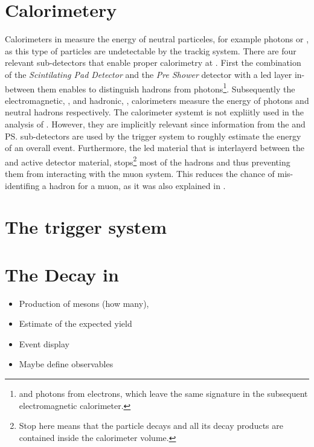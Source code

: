 \section{Calorimetery}
\label{det_calo}
Calorimeters in \lhcb measure the energy of neutral particeles, for example photons or \piz,
as this type of particles are undetectable by the trackig system. There are four relevant sub-detectors
that enable proper calorimetry at \lhcb. First the combination of the {\it Scintilating Pad Detector} \spd
and the {\it Pre Shower} detector with a led layer in-between them enables to distinguish hadrons from
photons\footnote{and photons from electrons, which leave the same signature in the subsequent electromagnetic calorimeter.}.
Subsequently the electromagnetic, \ecal, and hadronic, \hcal, calorimeters measure the energy of photons
and neutral hadrons respectively. The calorimeter systemt is not expliitly used in the analysis of .
However, they are implicitly relevant since information from the \spd and \ps sub-detectors are used
by the \lzero trigger system to roughly estimate the energy of an overall event. Furthermore, the
led material that is interlayerd between the \ecal and \hcal active detector material, stops\footnote{Stop here
means that the particle decays and all its decay products are contained inside the calorimeter volume.} most of
the hadrons and thus preventing them from interacting with the muon system. This reduces the chance
of mis-identifing a hadron for a muon, as it was also explained in .

\section{The trigger system}
\label{det_trigger}


%

\section{The \BJpsiKst Decay in \lhcb}
\label{BspsiKst_at_lhcb}
\begin{itemize}
  \item Production of \Bs mesons (how many),
  \item Estimate of the expected yield
  \item Event display
  \item Maybe define observables
\end{itemize}

